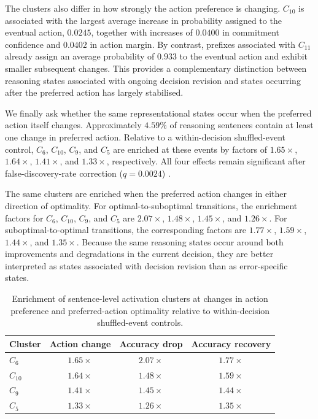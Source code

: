 \documentclass{article}
\begin{document}

The clusters also differ in how strongly the action preference is changing.
\(C_{10}\) is associated with the largest average increase in probability
assigned to the eventual action, \(0.0245\), together with increases of
\(0.0400\) in commitment confidence and \(0.0402\) in action margin.
By contrast, prefixes associated with \(C_{11}\) already assign an average
probability of \(0.933\) to the eventual action and exhibit smaller subsequent
changes. This provides a complementary distinction between reasoning states
associated with ongoing decision revision and states occurring after the
preferred action has largely stabilised.

We finally ask whether the same representational states occur when the
preferred action itself changes. Approximately \(4.59\%\) of reasoning
sentences contain at least one change in preferred action. Relative to a
within-decision shuffled-event control, \(C_6\), \(C_{10}\), \(C_9\), and
\(C_5\) are enriched at these events by factors of \(1.65\times\),
\(1.64\times\), \(1.41\times\), and \(1.33\times\), respectively. All four
effects remain significant after false-discovery-rate correction
(\(q=0.0024\)) \cite{benjamini1995controlling}.

The same clusters are enriched when the preferred action changes in either
direction of optimality. For optimal-to-suboptimal transitions, the enrichment
factors for \(C_6\), \(C_{10}\), \(C_9\), and \(C_5\) are \(2.07\times\),
\(1.48\times\), \(1.45\times\), and \(1.26\times\). For
suboptimal-to-optimal transitions, the corresponding factors are
\(1.77\times\), \(1.59\times\), \(1.44\times\), and \(1.35\times\).
Because the same reasoning states occur around both improvements and
degradations in the current decision, they are better interpreted as states
associated with decision revision than as error-specific states.

\begin{table}[htbp]
\centering
\small
\begin{tabular}{lccc}
\toprule
Cluster & Action change & Accuracy drop & Accuracy recovery \\
\midrule
\(C_6\)    & \(1.65\times\) & \(2.07\times\) & \(1.77\times\) \\
\(C_{10}\) & \(1.64\times\) & \(1.48\times\) & \(1.59\times\) \\
\(C_9\)    & \(1.41\times\) & \(1.45\times\) & \(1.44\times\) \\
\(C_5\)    & \(1.33\times\) & \(1.26\times\) & \(1.35\times\) \\
\bottomrule
\end{tabular}
\caption{Enrichment of sentence-level activation clusters at changes in
action preference and preferred-action optimality relative to
within-decision shuffled-event controls.}
\label{tab:reasoning-events}
\end{table}
\end{document}
